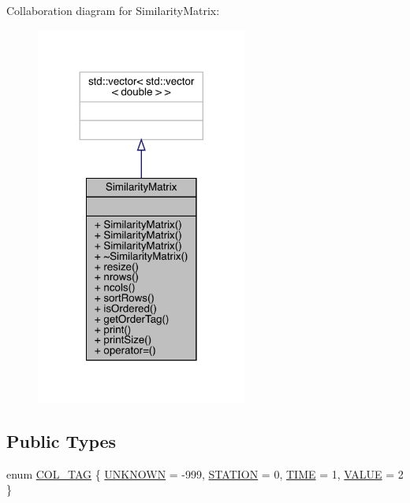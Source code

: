Collaboration diagram for Similarity\+Matrix\+:
\nopagebreak
\begin{figure}[H]
\begin{center}
\leavevmode
\includegraphics[width=197pt]{class_similarity_matrix__coll__graph}
\end{center}
\end{figure}
\subsection*{Public Types}
\begin{DoxyCompactItemize}
\item 
enum \mbox{\hyperlink{class_similarity_matrix_a79098014d74c2cf85f0dd8ad7fc4ac4f}{C\+O\+L\+\_\+\+T\+AG}} \{ \mbox{\hyperlink{class_similarity_matrix_a79098014d74c2cf85f0dd8ad7fc4ac4fa6b2d94433a07133a0d952836989bb2ae}{U\+N\+K\+N\+O\+WN}} = -\/999, 
\mbox{\hyperlink{class_similarity_matrix_a79098014d74c2cf85f0dd8ad7fc4ac4fa3c6e06230699bf1e00e3a3844e9eba1a}{S\+T\+A\+T\+I\+ON}} = 0, 
\mbox{\hyperlink{class_similarity_matrix_a79098014d74c2cf85f0dd8ad7fc4ac4fa3bd51efc4049e7e4475547e63ee3b539}{T\+I\+ME}} = 1, 
\mbox{\hyperlink{class_similarity_matrix_a79098014d74c2cf85f0dd8ad7fc4ac4faf5942e194b9ec347c132ae2211f3782c}{V\+A\+L\+UE}} = 2
 \}
\end{DoxyCompactItemize}
